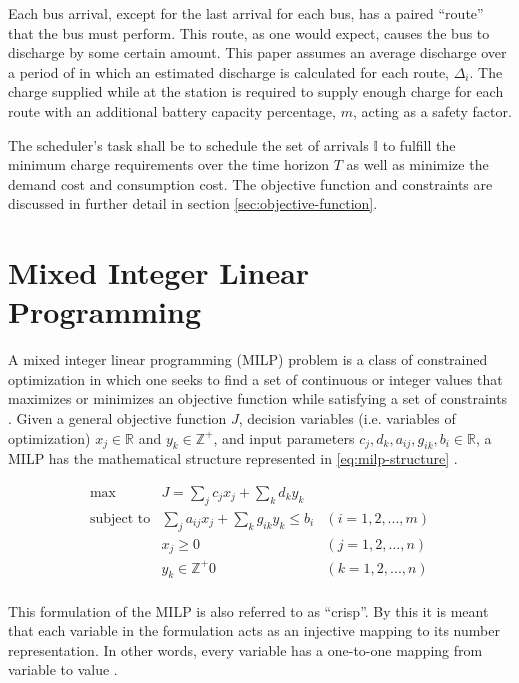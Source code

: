 \documentclass[ee,msthesis]{usuthesis}
\newcommand{\I}{\mathbb{I}}                 %
\begin{document}
Each bus arrival, except for the last arrival for each bus, has a paired ``route'' that the bus must perform. This route,
as one would expect, causes the bus to discharge by some certain amount. This paper assumes an average discharge over a
period of in which an estimated discharge is calculated for each route, \(\Delta_i\). The charge supplied while at the station
is required to supply enough charge for each route with an additional battery capacity percentage, \(m\), acting as a
safety factor.

The scheduler's task shall be to schedule the set of arrivals \(\I\) to fulfill the minimum charge requirements over the
time horizon \(T\) as well as minimize the demand cost and consumption cost. The objective function and constraints are
discussed in further detail in section \ref{sec:objective-function}.

\section{Mixed Integer Linear Programming}
\label{sec:org15e5574}

A mixed integer linear programming (MILP) problem is a class of constrained optimization in which one seeks to find a
set of continuous or integer values that maximizes or minimizes an objective function while satisfying a set of
constraints \cite{chen-2010-applied}. Given a general objective function \(J\), decision variables (i.e. variables of
optimization) \(x_j \in \mathbb{R}\) and \(y_k \in \mathbb{Z}^+\), and input parameters \(c_j, d_k, a_{ij}, g_{ik}, b_i \in \mathbb{R}\), a MILP has the
mathematical structure represented in \ref{eq:milp-structure} \cite{chen-2010-applied}.

\begin{equation}
\label{eq:milp-structure}
\begin{array}{lll}
\text{max}   & J = \sum_j c_j x_j + \sum_k d_k y_k            &                 \\
\text{subject to} & \sum_j a_{ij} x_j + \sum_k g_{ik} y_k  \le b_i & (i = 1,2,...,m) \\
                  & x_j \ge 0                                      & (j = 1,2,...,n) \\
                  & y_k \in \mathbb{Z^+}0                          & (k = 1,2,...,n) \\
\end{array}
\end{equation}

This formulation of the MILP is also referred to as ``crisp''. By this it is meant that each variable in the formulation
acts as an injective mapping to its number representation. In other words, every variable has a one-to-one mapping from
variable to value \cite{kaur-2016-introd-fuzzy}.
\end{document}
